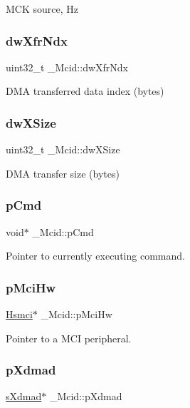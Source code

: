 M\+CK source, Hz \mbox{\label{struct__Mcid_a7f20beb689125b7a34cfa8a8b29d0b94}} 
\subsubsection{\texorpdfstring{dwXfrNdx}{dwXfrNdx}}
{\footnotesize\ttfamily uint32\+\_\+t \+\_\+\+Mcid\+::dw\+Xfr\+Ndx}

D\+MA transferred data index (bytes) \mbox{\label{struct__Mcid_a8bf0c59a5dfbb250c81ab74a167a737e}} 
\subsubsection{\texorpdfstring{dwXSize}{dwXSize}}
{\footnotesize\ttfamily uint32\+\_\+t \+\_\+\+Mcid\+::dw\+X\+Size}

D\+MA transfer size (bytes) \mbox{\label{struct__Mcid_a7131c2023da256370ea944710829c37a}} 
\subsubsection{\texorpdfstring{pCmd}{pCmd}}
{\footnotesize\ttfamily void$\ast$ \+\_\+\+Mcid\+::p\+Cmd}

Pointer to currently executing command. \mbox{\label{struct__Mcid_ad3cbbb9575f21ef189d3f42c047829ce}} 
\subsubsection{\texorpdfstring{pMciHw}{pMciHw}}
{\footnotesize\ttfamily \mbox{\hyperlink{structHsmci}{Hsmci}}$\ast$ \+\_\+\+Mcid\+::p\+Mci\+Hw}

Pointer to a M\+CI peripheral. \mbox{\label{struct__Mcid_a473ca87c4e75329e0fce0865c909d537}} 
\subsubsection{\texorpdfstring{pXdmad}{pXdmad}}
{\footnotesize\ttfamily \mbox{\hyperlink{group__dmad__structs_gaf2c13151514615a6beb35c0d868a5053}{s\+Xdmad}}$\ast$ \+\_\+\+Mcid\+::p\+Xdmad}


